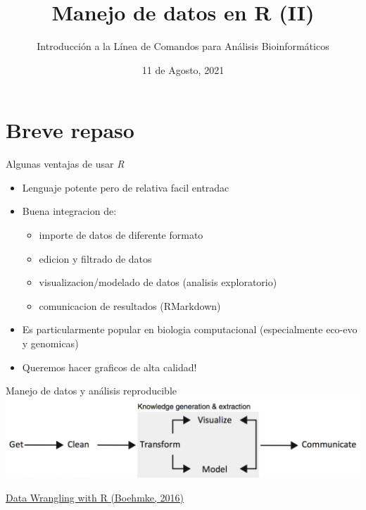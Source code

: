 \documentclass[
  10pt,
  ignorenonframetext,
]{beamer}
\title{Manejo de datos en R (II)}
\author{Introducción a la Línea de Comandos para Análisis
Bioinformáticos}
\date{11 de Agosto, 2021}
\providecommand{\tightlist}{%
  \setlength{\itemsep}{0pt}\setlength{\parskip}{0pt}}
\begin{document}
\frame{\titlepage}

\hypertarget{breve-repaso}{%
\section{Breve repaso}\label{breve-repaso}}

\begin{frame}{Algunas ventajas de usar \emph{R}}
\protect\hypertarget{algunas-ventajas-de-usar-r}{}
\begin{itemize}
\item
  Lenguaje potente pero de relativa facil entradac \vspace{10pt}
\item
  Buena integracion de:

  \begin{itemize}
  \tightlist
  \item
    importe de datos de diferente formato
  \item
    edicion y filtrado de datos
  \item
    visualizacion/modelado de datos (analisis exploratorio)
  \item
    comunicacion de resultados (RMarkdown)
  \end{itemize}
\end{itemize}

\vspace{10pt}

\begin{itemize}
\tightlist
\item
  Es particularmente popular en biologia computacional (especialmente
  eco-evo y genomicas) \vspace{10pt}
\item
  Queremos hacer graficos de alta calidad!
\end{itemize}
\end{frame}

\begin{frame}{Manejo de datos y análisis reproducible}
\protect\hypertarget{manejo-de-datos-y-anuxe1lisis-reproducible}{}
\includegraphics{../../imgs/analytic_process.png}

\vspace{60pt}

\raggedleft \small \href{http://93.174.95.29/_ads/6F902E466A32011DD94E2B6EEE505F9F}{Data
Wrangling with R (Boehmke, 2016)}
\end{frame}
\end{document}
